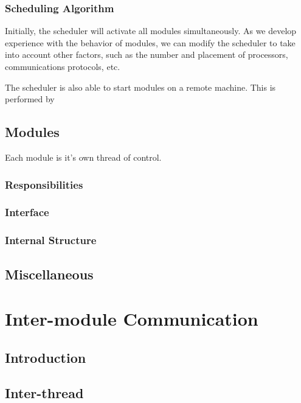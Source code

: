\subsection{Scheduling Algorithm}

Initially, the scheduler will activate all modules simultaneously.  As
we develop experience with the behavior of modules, we can modify the
scheduler to take into account other factors, such as the number and
placement of processors, communications protocols, etc.

The scheduler is also able to start modules on a remote machine.  This
is performed by 

\section{Modules}

Each module is it's own thread of control.

\subsection{Responsibilities}

\subsection{Interface}

\subsection{Internal Structure}


\section{Miscellaneous}




\chapter{Inter-module Communication}


\section{Introduction}


\section{Inter-thread}


